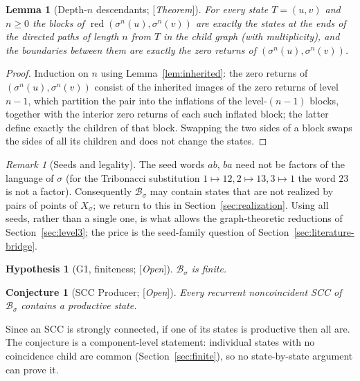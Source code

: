 \documentclass[11pt]{amsart}
\theoremstyle{plain}
\newtheorem{lemma}[theorem]{Lemma}
\newtheorem{conjecture}[theorem]{Conjecture}
\newtheorem{hypothesis}[theorem]{Hypothesis}
\theoremstyle{definition}
\theoremstyle{remark}
\newtheorem{remark}[theorem]{Remark}
\newcommand{\B}{\mathcal{B}}
\newcommand{\red}{\operatorname{red}}
\newcommand{\Status}[1]{\textup{[\textit{#1}]}}
\begin{document}
\begin{lemma}[Depth-$n$ descendants; \Status{Theorem}]\label{lem:descendants}
For every state $T=(u,v)$ and $n\ge0$ the blocks of $\red(\sigma^n(u),\sigma^n(v))$ are exactly the states at the ends of the directed paths of length $n$ from $T$ in the child graph (with multiplicity), and the boundaries between them are exactly the zero returns of $(\sigma^n(u),\sigma^n(v))$.
\end{lemma}
\begin{proof}
Induction on $n$ using Lemma~\ref{lem:inherited}: the zero returns of $(\sigma^{n}(u),\sigma^{n}(v))$ consist of the inherited images of the zero returns of level $n-1$, which partition the pair into the inflations of the level-$(n-1)$ blocks, together with the interior zero returns of each such inflated block; the latter define exactly the children of that block. Swapping the two sides of a block swaps the sides of all its children and does not change the states.
\end{proof}

\begin{remark}[Seeds and legality]\label{rem:legality}
The seed words $ab$, $ba$ need not be factors of the language of $\sigma$ (for the Tribonacci substitution $1\mapsto12,2\mapsto13,3\mapsto1$ the word $23$ is not a factor). Consequently $\B_\sigma$ may contain states that are not realized by pairs of points of $X_\sigma$; we return to this in Section~\ref{sec:realization}. Using all seeds, rather than a single one, is what allows the graph-theoretic reductions of Section~\ref{sec:level3}; the price is the seed-family question of Section~\ref{sec:literature-bridge}.
\end{remark}

\begin{hypothesis}[G1, finiteness; \Status{Open}]\label{hyp:G1}
$\B_\sigma$ is finite.
\end{hypothesis}

\begin{conjecture}[SCC Producer; \Status{Open}]\label{conj:producer}
Every recurrent noncoincident SCC of $\B_\sigma$ contains a productive state.
\end{conjecture}

Since an SCC is strongly connected, if one of its states is productive then all are. The conjecture is a component-level statement: individual states with no coincidence child are common (Section~\ref{sec:finite}), so no state-by-state argument can prove it.
\end{document}
